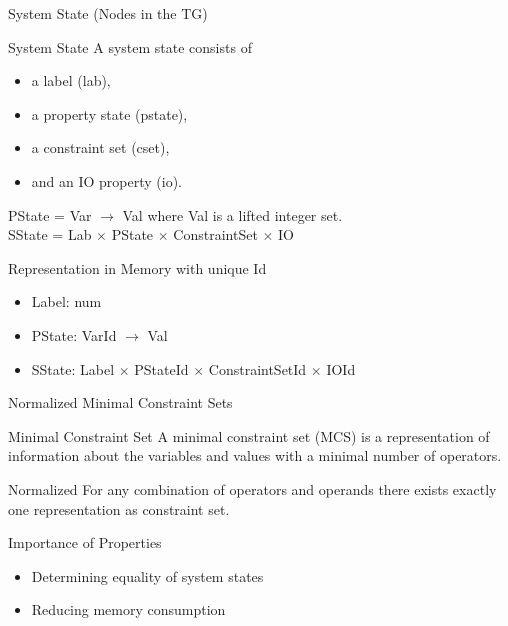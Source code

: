 \begin{frame}{System State (Nodes in the TG)}

\begin{block}{System State}
A system state consists of
\begin{itemize}
\item a label (lab), 
\item a property state (pstate),
\item a constraint set (cset),
\item and an IO property (io).
\end{itemize}

PState = Var $\rightarrow$ Val where Val is a lifted integer set.\\
SState = Lab $\times$ PState $\times$ ConstraintSet $\times$ IO\\
\end{block}

\begin{block}{Representation in Memory with unique Id}
\begin{itemize}
\item Label: num
\item PState: VarId $\rightarrow$ Val
\item SState: Label $\times$ PStateId $\times$ ConstraintSetId $\times$ IOId
\end{itemize}
\end{block}


\end{frame}

\begin{frame}{Normalized Minimal Constraint Sets}
\begin{block}{Minimal Constraint Set}
A minimal constraint set (MCS) is a representation of
information about the variables and values with a minimal number of operators.
\end{block}

\begin{block}{Normalized}
For any combination of operators and operands there exists exactly one representation as constraint set.
\end{block}

\begin{block}{Importance of Properties}
\begin{itemize}
\item Determining equality of system states
\item Reducing memory consumption
\end{itemize}
\end{block}

\end{frame}

